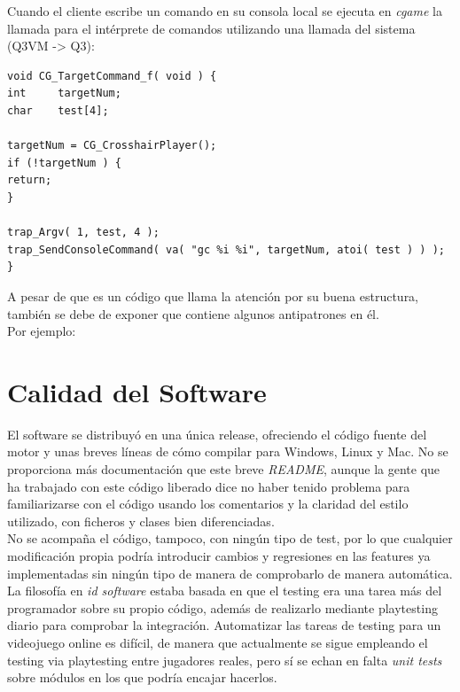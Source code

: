 \documentclass[a4paper,12pt]{report}
\begin{document}
	Cuando el cliente escribe un comando en su consola local se ejecuta en \textit{cgame} la llamada para el intérprete de comandos utilizando una llamada del sistema (Q3VM -> Q3):\\
	
	\begin{lstlisting}[style=C, numbers=none]
void CG_TargetCommand_f( void ) {
int		targetNum;
char	test[4];

targetNum = CG_CrosshairPlayer();
if (!targetNum ) {
return;
}

trap_Argv( 1, test, 4 );
trap_SendConsoleCommand( va( "gc %i %i", targetNum, atoi( test ) ) );
}
	\end{lstlisting}
	
	
	
	
A pesar de que es un código que llama la atención por su buena estructura, también se debe de exponer que contiene algunos antipatrones en él.\\

Por ejemplo:\\

	
	\section{Calidad del Software}
    El software se distribuyó en una única release, ofreciendo el código fuente del motor y unas breves líneas de cómo compilar para Windows, Linux y Mac. No se proporciona más documentación que este breve \textit{README}, aunque la gente que ha trabajado con este código liberado dice no haber tenido problema para familiarizarse con el código usando los comentarios y la claridad del estilo utilizado, con ficheros y clases bien diferenciadas.\\
    
    No se acompaña el código, tampoco, con ningún tipo de test, por lo que cualquier modificación propia podría introducir cambios y regresiones en las features ya implementadas sin ningún tipo de manera de comprobarlo de manera automática. La filosofía en \textit{id software} estaba basada en que el testing era una tarea más del programador sobre su propio código, además de realizarlo mediante playtesting diario para comprobar la integración. Automatizar las tareas de testing para un videojuego online es difícil, de manera que actualmente se sigue empleando el testing via playtesting entre jugadores reales, pero sí se echan en falta \textit{unit tests} sobre módulos en los que podría encajar hacerlos.\\
    
\end{document}
